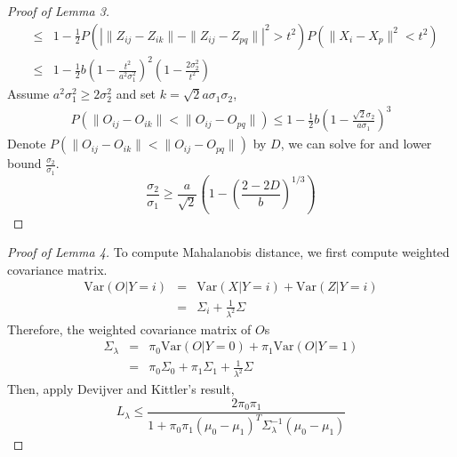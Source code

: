 \documentclass{article}
\begin{document}
\begin{proof}[Proof of Lemma 3]
\begin{eqnarray*}
&\leq& 1 - \frac{1}{2}P(|\|Z_{ij}-Z_{ik}\|-\|Z_{ij}-Z_{pq}\||^2 > t^2 )P(\|X_{i}-X_{p}\|^2 < t^2) \\
&\leq& 1- \frac{1}{2}b(1-\frac{t^2}{a^2 \sigma_1^2})^2(1 - \frac{2 \sigma_2^2}{t^2})
\end{eqnarray*}
Assume $a^2 \sigma_1^2 \geq 2 \sigma_2^2$ and set $k=\sqrt{2} a \sigma_1 \sigma_2$,
\begin{eqnarray*}
P(\|O_{ij}-O_{ik}\| < \|O_{ij}-O_{pq}\|) \leq  1- \frac{1}{2}b(1 - \frac{\sqrt{2} \sigma_2}{a\sigma_1})^3
\end{eqnarray*}
Denote $P(\|O_{ij}-O_{ik}\| < \|O_{ij}-O_{pq}\|)$ by $D$, we can  solve for and lower bound $\frac{ \sigma_2}{\sigma_1}$.
\[\frac{ \sigma_2}{\sigma_1} \geq\frac{a}{\sqrt{2}} (1-(\frac{2-2D}{b})^{1/3} )\]


\end{proof}


\begin{proof}[Proof of Lemma 4]
To compute Mahalanobis distance, we first compute weighted covariance matrix.
\begin{eqnarray*}
\text{Var}(O|Y=i) &=& \text{Var}(X|Y=i)+\text{Var}(Z|Y=i) \\
&=& \Sigma_i+\frac{1}{\lambda^2}\Sigma
\end{eqnarray*}
Therefore, the weighted covariance matrix of $O$s
\begin{eqnarray*}
\Sigma_\lambda&=&\pi_0\text{Var}(O|Y=0)+\pi_1\text{Var}(O|Y=1) \\
&=&\pi_0\Sigma_0+\pi_1\Sigma_1+\frac{1}{\lambda^2}\Sigma
\end{eqnarray*}
Then, apply Devijver and Kittler's result,
\[L_\lambda \leq \frac{2\pi_0\pi_1}{1+\pi_0\pi_1(\mu_0-\mu_1)^T\Sigma_\lambda^{-1}(\mu_0-\mu_1)}\]
\end{proof}


\newpage
\small{


}
\end{document}
